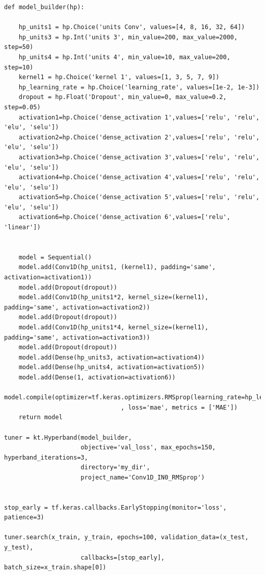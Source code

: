 \documentclass[openany]{article}
\begin{document}
\begin{verbatim}
def model_builder(hp):

    hp_units1 = hp.Choice('units Conv', values=[4, 8, 16, 32, 64])
    hp_units3 = hp.Int('units 3', min_value=200, max_value=2000, step=50)
    hp_units4 = hp.Int('units 4', min_value=10, max_value=200, step=10)
    kernel1 = hp.Choice('kernel 1', values=[1, 3, 5, 7, 9])
    hp_learning_rate = hp.Choice('learning_rate', values=[1e-2, 1e-3])
    dropout = hp.Float('Dropout', min_value=0, max_value=0.2, step=0.05)
    activation1=hp.Choice('dense_activation 1',values=['relu', 'relu', 'elu', 'selu'])
    activation2=hp.Choice('dense_activation 2',values=['relu', 'relu', 'elu', 'selu'])
    activation3=hp.Choice('dense_activation 3',values=['relu', 'relu', 'elu', 'selu'])
    activation4=hp.Choice('dense_activation 4',values=['relu', 'relu', 'elu', 'selu'])
    activation5=hp.Choice('dense_activation 5',values=['relu', 'relu', 'elu', 'selu'])
    activation6=hp.Choice('dense_activation 6',values=['relu', 'linear'])


    model = Sequential()
    model.add(Conv1D(hp_units1, (kernel1), padding='same', activation=activation1))
    model.add(Dropout(dropout))
    model.add(Conv1D(hp_units1*2, kernel_size=(kernel1), padding='same', activation=activation2))
    model.add(Dropout(dropout))
    model.add(Conv1D(hp_units1*4, kernel_size=(kernel1), padding='same', activation=activation3))
    model.add(Dropout(dropout))
    model.add(Dense(hp_units3, activation=activation4))
    model.add(Dense(hp_units4, activation=activation5))
    model.add(Dense(1, activation=activation6))
    model.compile(optimizer=tf.keras.optimizers.RMSprop(learning_rate=hp_learning_rate)
                                , loss='mae', metrics = ['MAE'])
    return model

tuner = kt.Hyperband(model_builder, 
                     objective='val_loss', max_epochs=150, hyperband_iterations=3,
                     directory='my_dir',
                     project_name='Conv1D_IN0_RMSprop')


stop_early = tf.keras.callbacks.EarlyStopping(monitor='loss', patience=3)

tuner.search(x_train, y_train, epochs=100, validation_data=(x_test, y_test),
                     callbacks=[stop_early], batch_size=x_train.shape[0])


\end{verbatim}
\end{document}
